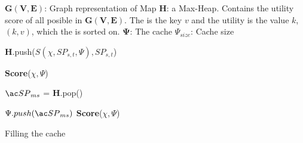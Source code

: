 \begin{algorithm}%
\dontprintsemicolon
\SetVline


\KwData
{

	$\mathbf{G(V,E)}$: Graph representation of Map \;
	\textbf{H}: a Max-Heap. Contains the utility score of all posible \spaths in $\mathbf{G(V,E)}$. The \spath is the key $v$ and the utility is the value $k$, $(k, v)$, which the is sorted on.\;
	$\mathbf{\Psi}$: The cache \;
	$\Psi_{size}$: Cache size \;
}


{
	{
		\textbf{H}.push($S(\chi, SP_{s,t}, \Psi), SP_{s,t}$) \;
	}
}

\textbf{Score}($\chi, \Psi$) \;

{
	$\spath_{ms}$ = \textbf{H}.pop() \; 
	{
		$\Psi.push(\spath_{ms})$\;
		\textbf{Score}($\chi, \Psi$) \;
		
	}
}

\caption{Filling the cache}
\label{alg:greedy}
\end{algorithm}